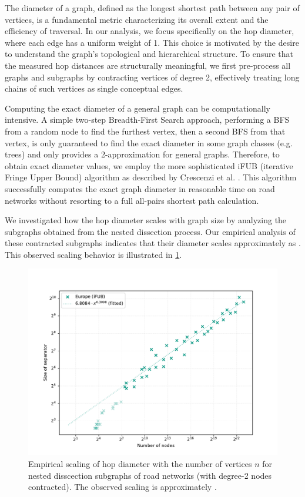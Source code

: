 The diameter of a graph, defined as the longest shortest path between any pair of vertices, is a fundamental metric characterizing its overall extent and the efficiency of traversal.
In our analysis, we focus specifically on the hop diameter, where each edge has a uniform weight of 1.
This choice is motivated by the desire to understand the graph's topological and hierarchical structure.
To ensure that the measured hop distances are structurally meaningful, we first pre-process all graphs and subgraphs by contracting vertices of degree 2, effectively treating long chains of such vertices as single conceptual edges.

Computing the exact diameter of a general graph can be computationally intensive.
A simple two-step Breadth-First Search approach, performing a BFS from a random node to find the furthest vertex, then a second BFS from that vertex, is only guaranteed to find the exact diameter in some graph classes (e.g. trees) and only provides a 2-approximation for general graphs.
Therefore, to obtain exact diameter values, we employ the more sophisticated iFUB (iterative Fringe Upper Bound) algorithm as described by Crescenzi et al. \cite{crescenzi_computing_2013}.
This algorithm successfully computes the exact graph diameter in reasonable time on road networks without resorting to a full all-pairs shortest path calculation.

We investigated how the hop diameter scales with graph size by analyzing the subgraphs obtained from the nested dissection process.
Our empirical analysis of these contracted subgraphs indicates that their diameter scales approximately as .
This observed scaling behavior is illustrated in \cref{fig:road_network_diameter_scaling}.

\begin{figure}[tbhp]
	\centering
	\includegraphics[width=0.7\linewidth]{graphics/diam-europe-ifub.pdf}
	\caption{Empirical scaling of hop diameter with the number of vertices \(n\) for nested disscection subgraphs of road networks (with degree-2 nodes contracted). The observed scaling is approximately .}
	\label{fig:road_network_diameter_scaling}
\end{figure}










